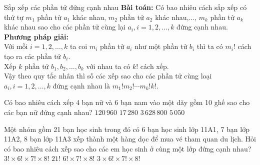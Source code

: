 \begin{dang}{Sắp xếp các phần tử đứng cạnh nhau}
\textbf{Bài toán:} Có bao nhiêu cách sắp xếp có thứ tự $m_1$ phần tử $a_1$ khác nhau, $m_2$ phần tử $a_2$ khác nhau,..., $m_k$ phần tử $a_k$ khác nhau sao cho các phần tử cùng lại $a_i, i=1,2,\ldots,k$ đứng cạnh nhau. \\
\textbf{Phương pháp giải:}\\
Với mỗi $i=1,2,\ldots, k$ ta coi $m_i$ phần tử $a_i$ như một phần tử $b_i$ thì ta có $m_i !$ cách tạo ra các phần tử $b_i$.\\
Xếp $k$ phần tử $b_1, b_2, \ldots, b_k$ với nhau ta có $k!$ cách xếp.\\
Vậy theo quy tắc nhân thì số các xếp sao cho các phần tử cùng loại $a_i, i=1,2,\ldots,k$ đứng cạnh nhau là $m_1 ! m_2 ! \cdots m_k ! k!$.
\end{dang}
\begin{vd}%
Có bao nhiêu cách xếp 4 bạn nữ và 6 bạn nam vào một dãy gồm 10 ghế sao cho các bạn nữ đứng cạnh nhau?
\choice
{\True $120\,960$}
{$17\,280$}
{$3\,628\,800$}
{$5\,050$}
\end{vd}
\begin{vd}%
Một nhóm gồm 21 bạn học sinh trong đó có 6 bạn học sinh lớp 11A1, 7 bạn lớp 11A2, 8 bạn lớp 11A3 xếp thành một hàng dọc để mua vé tham quan du lịch. Hỏi có bao nhiêu cách xếp sao cho các em học sinh ở cùng một lớp đứng cạnh nhau?
\choice
{\True $3!\times 6! \times 7!\times 8!$}
{$21!$}
{$6! \times 7!\times 8!$}
{$3\times 6! \times 7!\times 8!$}
\end{vd}

